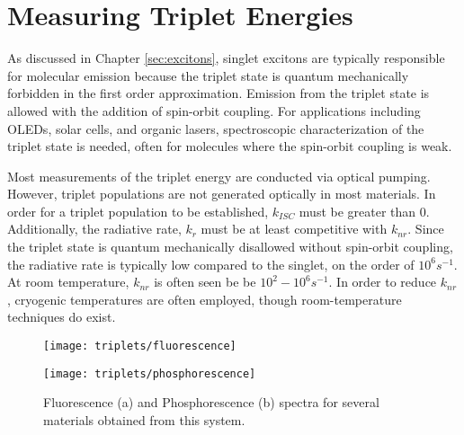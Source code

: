\documentclass[../thesis.tex]{subfiles}
\begin{document}
\chapter{Measuring Triplet Energies}

As discussed in Chapter \ref{sec:excitons}, singlet excitons are typically responsible for molecular emission because the triplet state is quantum mechanically forbidden in the first order approximation.\supercite{Turro1991a}
Emission from the triplet state is allowed with the addition of spin-orbit coupling.\supercite{Baldo1998a}
For applications including OLEDs, solar cells, and organic lasers, spectroscopic characterization of the triplet state is needed, often for molecules where the spin-orbit coupling is weak.\supercite{Tokito2003a,Goushi2004d,Zhang2011a,Schueppel2007}

Most measurements of the triplet energy are conducted via optical pumping.\supercite{Turro1991a,Goushi2004d,Padhye1956,Holmes2003}
However, triplet populations are not generated optically in most materials.\supercite{Turro1991a}
In order for a triplet population to be established, $k_{ISC}$ must be greater than 0.
Additionally, the radiative rate, $k_r$ must be at least competitive with $k_{nr}$.
Since the triplet state is quantum mechanically disallowed without spin-orbit coupling, the radiative rate is typically low compared to the singlet, on the order of $10^6 s^{-1}$.
At room temperature, $k_{nr}$ is often seen be be $10^2-10^6 s^{-1}$.\supercite{Reineke2014}
In order to reduce $k_{nr}$, cryogenic temperatures are often employed, though room-temperature techniques do exist.\supercite{Reineke2014}

\begin{wrapfigure}{r}{.5\textwidth}
    \begin{minipage}{\linewidth}
    \centering%
    \texttt{[image: triplets/fluorescence]}

    \texttt{[image: triplets/phosphorescence]}
\end{minipage}
\caption{Fluorescence (a) and Phosphorescence (b) spectra for several materials obtained from this system.}
\label{fig:triplets}
\end{wrapfigure}
\end{document}
